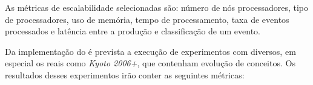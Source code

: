 


As métricas de escalabilidade selecionadas são: número de nós processadores,
tipo de processadores, uso de memória, tempo de processamento, taxa de eventos
processados e latência entre a produção e classificação de um evento.




Da implementação do \mfog é prevista a execução de experimentos com \datasets
diversos, em especial os \datasets reais como \emph{Kyoto 2006+},
que contenham evolução de conceitos.
Os resultados desses experimentos irão conter as seguintes métricas:

